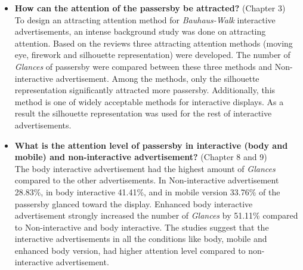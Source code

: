 







\begin{itemize}

\item \textbf{ How can the attention of the passersby be attracted?} (Chapter 3) \\
To design an attracting attention method for \emph{Bauhaus-Walk} interactive advertisements, an intense background study was done on attracting attention. Based on the reviews three attracting attention methods (moving eye, firework and silhouette representation) were developed. The number of \emph{Glances} of passersby were compared between these three methods and Non-interactive advertisement. Among the methods, only the silhouette representation significantly attracted more passersby. Additionally, this method is one of widely acceptable methods for interactive displays. As a result the silhouette representation was used for the rest of interactive advertisements.

\item \textbf{What is the attention level of passersby in interactive (body and mobile) and non-interactive advertisement?} (Chapter 8 and 9)\\
The body interactive advertisement had the highest amount of \emph{Glances} compared to the other advertisements. In Non-interactive advertisement 28.83\%, in body interactive 41.41\%, and in mobile version 33.76\% of the passersby glanced toward the display. Enhanced body interactive advertisement strongly increased the number of \emph{Glances} by 51.11\% compared to Non-interactive and body interactive. The studies suggest that the interactive advertisements in all the conditions like body, mobile and enhanced body version, had higher attention level compared to non-interactive advertisement. 



\begin{table}[H]
\caption{Week sequence}
\label{tab:advertisementWeeks}
\centering
{}
\end{table}







\end{itemize}
